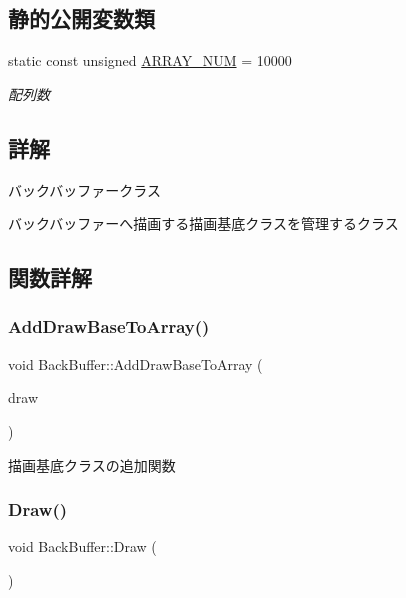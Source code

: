 \subsection*{静的公開変数類}
\begin{DoxyCompactItemize}
\item 
static const unsigned \mbox{\hyperlink{class_back_buffer_a28e89a0c543b6ae579c8ab75f9917059}{A\+R\+R\+A\+Y\+\_\+\+N\+UM}} = 10000
\begin{DoxyCompactList}\small\item\em 配列数 \end{DoxyCompactList}\end{DoxyCompactItemize}


\subsection{詳解}
バックバッファークラス 

バックバッファーへ描画する描画基底クラスを管理するクラス 

\subsection{関数詳解}
\mbox{\label{class_back_buffer_ab9cae17a69086b467f6e016e432b224b}} 
\subsubsection{\texorpdfstring{Add\+Draw\+Base\+To\+Array()}{AddDrawBaseToArray()}}
{\footnotesize\ttfamily void Back\+Buffer\+::\+Add\+Draw\+Base\+To\+Array (\begin{DoxyParamCaption}\item[{\mbox{\hyperlink{class_draw_base}{Draw\+Base}} $\ast$}]{draw }\end{DoxyParamCaption})}



描画基底クラスの追加関数 

\mbox{\label{class_back_buffer_adb51191c002489e4faac54199449e9ef}} 
\subsubsection{\texorpdfstring{Draw()}{Draw()}}
{\footnotesize\ttfamily void Back\+Buffer\+::\+Draw (\begin{DoxyParamCaption}{ }\end{DoxyParamCaption})}



